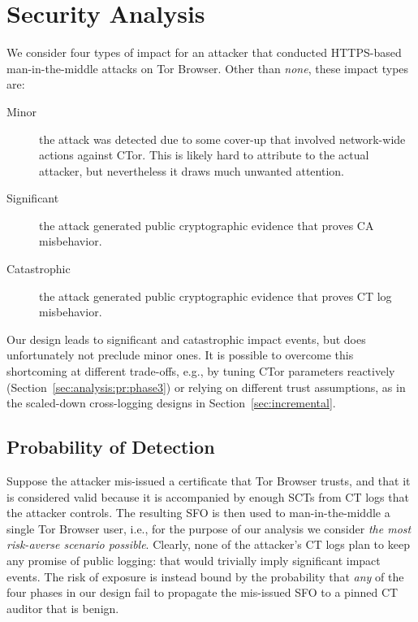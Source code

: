 \section{Security Analysis} \label{sec:analysis}

We consider four types of impact for an attacker that conducted
HTTPS-based man-in-the-middle attacks on Tor Browser.  Other than \emph{none},
these impact types are:
\begin{description}
	\item[Minor] the attack was detected due to some cover-up that involved
		network-wide actions against CTor.  This is likely hard to attribute to
		the actual attacker, but nevertheless it draws much unwanted attention.
	\item[Significant] the attack generated public cryptographic evidence
		that proves CA misbehavior.
	\item[Catastrophic] the attack generated public cryptographic evidence
		that proves CT log misbehavior.
\end{description}

Our design leads to significant and catastrophic impact events, but does
unfortunately not preclude minor ones.  It is possible to overcome this
shortcoming at different trade-offs, e.g., by tuning CTor parameters reactively
(Section~\ref{sec:analysis:pr:phase3}) or relying on different trust
assumptions, as in the scaled-down cross-logging designs in
Section~\ref{sec:incremental}.

\subsection{Probability of Detection} \label{sec:analysis:pr}
Suppose the attacker mis-issued a certificate that Tor Browser trusts, and that
it is considered valid because it is accompanied by enough SCTs from CT logs
that the attacker controls.  The resulting SFO is then used to man-in-the-middle
a single Tor Browser user, i.e., for the purpose of our analysis we consider
\emph{the most risk-averse scenario possible}.  Clearly, none of the attacker's
CT logs plan to keep any promise of public logging:
	that would trivially imply significant impact events.
The risk of exposure is instead bound by the probability that \emph{any} of the
four phases in our design fail to propagate the mis-issued SFO to a pinned CT
auditor that is benign.

